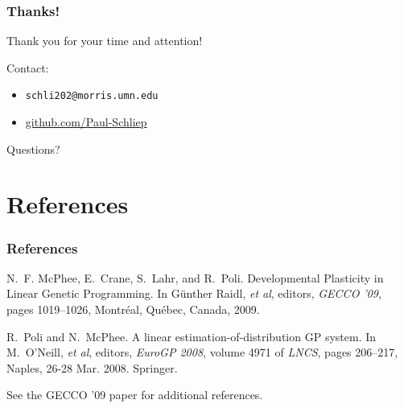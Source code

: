 \documentclass{beamer}
\newcommand{\linespace}{\vskip 0.25cm}
\begin{document}
\begin{frame}
	\frametitle{Thanks!}
	
	Thank you for your time and attention!
		
	\linespace
	\linespace
	
	Contact:  
	\begin{itemize}
		\item \texttt{schli202@morris.umn.edu}
		\item \url{github.com/Paul-Schliep}
	\end{itemize}
	
	\linespace
	\linespace
	
	\begin{center}
	{\huge Questions?}
	\end{center}
\end{frame}

\section*{References}

\begin{frame} 
	\frametitle{References} 
	
	\begin{thebibliography}{lskdjf}
	
N.~F. McPhee, E.~Crane, S.~Lahr, and R.~Poli.
\newblock Developmental Plasticity in Linear Genetic Programming.
\newblock In G\"unther Raidl, \emph{et al}, editors, {\em GECCO '09}, pages 1019--1026, Montr\'eal, Qu\'ebec, Canada, 2009.
	
	R.~Poli and N.~McPhee.
\newblock A linear estimation-of-distribution {GP} system.
\newblock In M.~O'Neill, \emph{et al}, editors, {\em EuroGP 2008}, volume
  4971 of {\em LNCS}, pages 206--217, Naples,
  26-28 Mar. 2008. Springer.
  
  	\end{thebibliography}
	
	\linespace
	\begin{center}
	See the GECCO '09 paper for additional references.
	\end{center}
\end{frame} 
\end{document}
